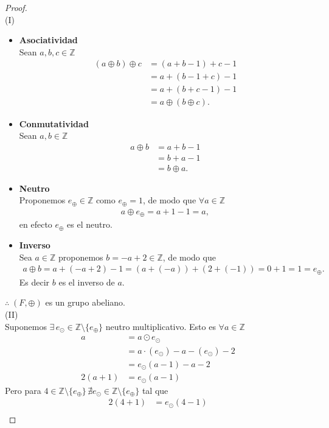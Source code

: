 \documentclass[11pt,letterpaper]{article}
\newcommand{\Z}{\mathbb{Z}}
\begin{document}
\begin{proof}
	\,\\ (I)\\
   \begin{itemize}
	\item \textbf{Asociatividad} \\
	Sean $a,b,c\in\Z$
	\begin{align*}
		(a\oplus b)\oplus c&=(a+b-1)+c-1\\
		&=a+(b-1+c)-1\\
		&=a+(b+c-1)-1\\
		&=a\oplus(b\oplus c).
	\end{align*}
	\item \textbf{Conmutatividad}\\
	Sean $a,b\in\Z$
	\begin{align*}
		a\oplus b&=a+b-1\\
		&=b+a-1\\
		&=b\oplus a.
	\end{align*}
	\item \textbf{Neutro}\\
	Proponemos $e_{\oplus}\in\Z$ como $e_{\oplus}=1$, de modo que $\forall a\in\Z$
		\begin{align*}
			a\oplus e_{\oplus}=a+1-1=a,
		\end{align*}
		en efecto $e_{\oplus}$ es el neutro.
		\item \textbf{Inverso}\\
		Sea $a\in\Z$ proponemos $b=-a+2\in\Z$, de modo que
		\begin{align*}
			a\oplus b=a+(-a+2)-1=(a+(-a))+(2+(-1))=0+1=1=e_{\oplus}.
		\end{align*}
		Es decir $b$ es el inverso de $a$.
   \end{itemize}
   $\therefore\; (F,\oplus)$ es un grupo abeliano.\\(II)\\
   Suponemos $\exists\,e_\odot\in\Z\setminus\{e_\oplus\}$ neutro multiplicativo. Esto es $\forall a\in\Z$
   \begin{align*}
	a&=a\odot{e_\odot}\\
	&=a\cdot(e_\odot)-a-(e_\odot)-2\\
	&=e_\odot(a-1)-a-2\\
	2(a+1)&=e_\odot(a-1)
   \end{align*}
   Pero para $4\in\Z\setminus\{e_\oplus\}\,\nexists e_\odot \in\Z\setminus\{e_\oplus\}$ tal que
   \begin{align*}
	2(4+1)&=e_\odot(4-1)\\

\end{align*}
\end{proof}
\end{document}
